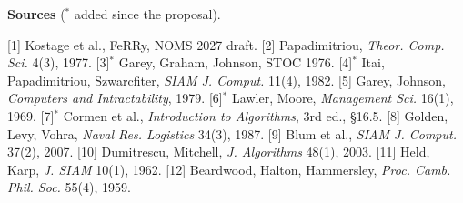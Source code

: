 \documentclass[10pt]{article}
\newcommand{\head}[1]{\par\vspace{3pt}\noindent\textbf{#1}\enspace}
\begin{document}
\head{Sources} ($^*$ added since the proposal).
{\footnotesize
[1] Kostage et al., FeRRy, NOMS 2027 draft.
[2] Papadimitriou, \emph{Theor. Comp. Sci.} 4(3), 1977.
[3]$^*$ Garey, Graham, Johnson, STOC 1976.
[4]$^*$ Itai, Papadimitriou, Szwarcfiter, \emph{SIAM J. Comput.} 11(4), 1982.
[5] Garey, Johnson, \emph{Computers and Intractability}, 1979.
[6]$^*$ Lawler, Moore, \emph{Management Sci.} 16(1), 1969.
[7]$^*$ Cormen et al., \emph{Introduction to Algorithms}, 3rd ed., \S16.5.
[8] Golden, Levy, Vohra, \emph{Naval Res. Logistics} 34(3), 1987.
[9] Blum et al., \emph{SIAM J. Comput.} 37(2), 2007.
[10] Dumitrescu, Mitchell, \emph{J. Algorithms} 48(1), 2003.
[11] Held, Karp, \emph{J. SIAM} 10(1), 1962.
[12] Beardwood, Halton, Hammersley, \emph{Proc. Camb. Phil. Soc.} 55(4), 1959.\par}
\end{document}
